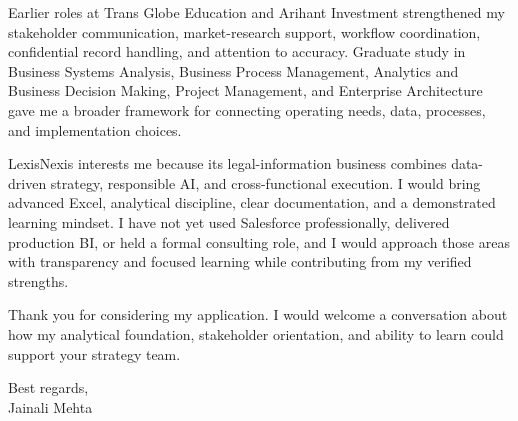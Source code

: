 \documentclass[letterpaper,11pt]{article}
\begin{document}
\bigbreak
Earlier roles at Trans Globe Education and Arihant Investment strengthened my stakeholder communication, market-research support, workflow coordination, confidential record handling, and attention to accuracy. Graduate study in Business Systems Analysis, Business Process Management, Analytics and Business Decision Making, Project Management, and Enterprise Architecture gave me a broader framework for connecting operating needs, data, processes, and implementation choices.

\bigbreak
LexisNexis interests me because its legal-information business combines data-driven strategy, responsible AI, and cross-functional execution. I would bring advanced Excel, analytical discipline, clear documentation, and a demonstrated learning mindset. I have not yet used Salesforce professionally, delivered production BI, or held a formal consulting role, and I would approach those areas with transparency and focused learning while contributing from my verified strengths.

\bigbreak
Thank you for considering my application. I would welcome a conversation about how my analytical foundation, stakeholder orientation, and ability to learn could support your strategy team.

\bigbreak
Best regards,\\
Jainali Mehta
\end{document}
